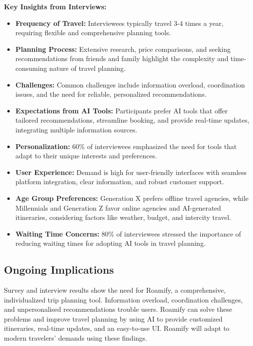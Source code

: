\documentclass[conference]{IEEEtran}
\begin{document}
        \textbf{Key Insights from Interviews:}
        \begin{itemize}
            \item \textbf{Frequency of Travel:} Interviewees typically travel 3-4 times a year, requiring flexible and comprehensive planning tools.
            \item \textbf{Planning Process:} Extensive research, price comparisons, and seeking recommendations from friends and family highlight the complexity and time-consuming nature of travel planning.
            \item \textbf{Challenges:} Common challenges include information overload, coordination issues, and the need for reliable, personalized recommendations.
            \item \textbf{Expectations from AI Tools:} Participants prefer AI tools that offer tailored recommendations, streamline booking, and provide real-time updates, integrating multiple information sources.
            \item \textbf{Personalization:} 60\% of interviewees emphasized the need for tools that adapt to their unique interests and preferences.
            \item \textbf{User Experience:} Demand is high for user-friendly interfaces with seamless platform integration, clear information, and robust customer support.
            \item \textbf{Age Group Preferences:} Generation X prefers offline travel agencies, while Millennials and Generation Z favor online agencies and AI-generated itineraries, considering factors like weather, budget, and intercity travel.
            \item \textbf{Waiting Time Concerns:} 80\% of interviewees stressed the importance of reducing waiting times for adopting AI tools in travel planning.
        \end{itemize}


    \subsection{Ongoing Implications}
        Survey and interview results show the need for Roamify, a comprehensive, individualized trip planning tool. Information overload, coordination challenges, and unpersonalised recommendations trouble users. Roamify can solve these problems and improve travel planning by using AI to provide customized itineraries, real-time updates, and an easy-to-use UI. Roamify will adapt to modern travelers' demands using these findings.
\end{document}
